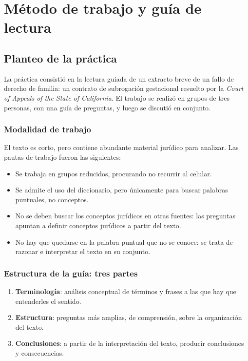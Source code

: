 \documentclass[12pt,oneside]{book}
\begin{document}
\tableofcontents
\clearpage


\chapter{Método de trabajo y guía de lectura}

\section{Planteo de la práctica}

La práctica consistió en la lectura guiada de un extracto breve de un fallo de derecho de familia: un contrato de subrogación gestacional resuelto por la \textit{Court of Appeals of the State of California}. El trabajo se realizó en grupos de tres personas, con una guía de preguntas, y luego se discutió en conjunto.

\subsection{Modalidad de trabajo}

El texto es corto, pero contiene abundante material jurídico para analizar. Las pautas de trabajo fueron las siguientes:

\begin{itemize}
    \item Se trabaja en grupos reducidos, procurando no recurrir al celular.
    \item Se admite el uso del diccionario, pero únicamente para buscar palabras puntuales, no conceptos.
    \item No se deben buscar los conceptos jurídicos en otras fuentes: las preguntas apuntan a definir conceptos jurídicos a partir del texto.
    \item No hay que quedarse en la palabra puntual que no se conoce: se trata de razonar e interpretar el texto en su conjunto.
\end{itemize}

\subsection{Estructura de la guía: tres partes}

\begin{enumerate}
    \item \textbf{Terminología}: análisis conceptual de términos y frases a las que hay que entenderles el sentido.
    \item \textbf{Estructura}: preguntas más amplias, de comprensión, sobre la organización del texto.
    \item \textbf{Conclusiones}: a partir de la interpretación del texto, producir conclusiones y consecuencias.
\end{enumerate}
\end{document}
